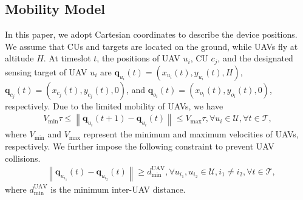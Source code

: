 \documentclass[10pt,journal,compsoc]{IEEEtran}
\begin{document}
\subsection{Mobility Model}
In this paper, we adopt Cartesian coordinates to describe the device positions. 
We assume that CUs and targets are located on the ground, while UAVs fly at altitude $H$\cite{Related works:ISCC-PRO:TWC:Joint-Sensing-And}. 
At timeslot $t$, the positions of UAV $u_{i}$, CU $c_{j}$, and the designated sensing target of UAV $u_{i}$ are $\bm{q}_{u_{i}}(t)=\left(x_{u_{i}}(t), y_{u_{i}}(t), H\right)$, $\bm{q}_{c_{j}}(t)=\left(x_{c_{j}}(t), y_{c_{j}}(t), 0\right)$, and $\bm{q}_{o_{i}}(t) = \left(x_{o_{i}}(t), y_{o_{i}}(t), 0\right)$, respectively. 
Due to the limited mobility of UAVs, we have 
\begin{align}\label{P0:UAV-speed}
    V_{\min}\tau \le \left\|\bm{q}_{u_{i}}(t + 1) - \bm{q}_{u_{i}}(t)\right\| \le V_{\max} \tau, \forall u_{i} \in \mathcal{U}, \forall t \in \mathcal{T},
\end{align}
where $V_{\min}$ and $V_{\max}$ represent the minimum and maximum velocities of UAVs, respectively. We further impose the following constraint to prevent UAV collisions.
\begin{align}\label{P0:UAV-collision}
    & \left\|\bm{q}_{u_{i_{1}}}(t) - \bm{q}_{u_{i_{2}}}(t)\right\| \ge d^{\text{UAV}}_{\min}, %
    \forall u_{i_{1}}, u_{i_{2}} \in \mathcal{U}, i_{1} \neq i_{2}, \forall t \in \mathcal{T},
\end{align}
where $d_{\min}^{\text{UAV}}$ is the minimum inter-UAV distance.

\end{document}
